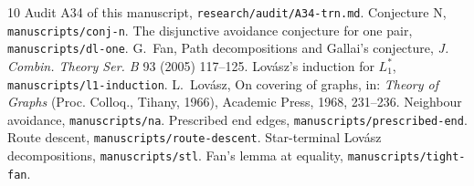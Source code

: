 \documentclass[11pt]{amsart}
\theoremstyle{definition}
\begin{document}
\begin{thebibliography}{10}
 Audit A34 of this manuscript, \texttt{research/audit/A34-trn.md}.
 Conjecture N, \texttt{manuscripts/conj-n}.
 The disjunctive avoidance conjecture for one pair, \texttt{manuscripts/dl-one}.
 G.~Fan, Path decompositions and Gallai's conjecture, \emph{J. Combin. Theory Ser.
B} 93 (2005) 117--125.
 Lov\'asz's induction for $L_1^*$, \texttt{manuscripts/l1-induction}.
 L.~Lov\'asz, On covering of graphs, in: \emph{Theory of Graphs} (Proc. Colloq.,
Tihany, 1966), Academic Press, 1968, 231--236.
 Neighbour avoidance, \texttt{manuscripts/na}.
 Prescribed end edges, \texttt{manuscripts/prescribed-end}.
 Route descent, \texttt{manuscripts/route-descent}.
 Star-terminal Lov\'asz decompositions, \texttt{manuscripts/stl}.
 Fan's lemma at equality, \texttt{manuscripts/tight-fan}.
\end{thebibliography}
\end{document}
